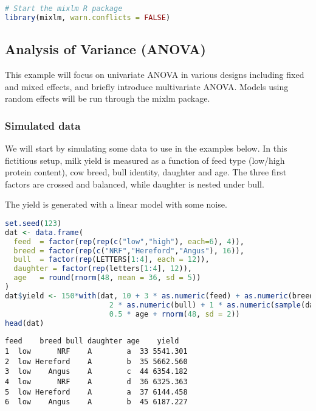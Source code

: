 \begin{lstlisting}[language=R, columns=fullflexible, basicstyle=\linespread{0.85}\small\ttfamily, stringstyle=\color{DarkGreen}, keywordstyle=\color{blue}, commentstyle=\color{DarkGreen},]
# Start the mixlm R package
library(mixlm, warn.conflicts = FALSE)
\end{lstlisting}

\subsection{Analysis of Variance
(ANOVA)}\label{analysis-of-variance-anova}

This example will focus on univariate ANOVA in various designs
including fixed and mixed effects, and briefly introduce multivariate
ANOVA. Models using random effects will be run through the mixlm
package.

\subsubsection{Simulated data}\label{simulated-data}

We will start by simulating some data to use in the examples below. In
this fictitious setup, milk yield is measured as a function of feed type
(low/high protein content), cow breed, bull identity, daughter and age.
The three first factors are crossed and balanced, while daughter is
nested under bull.

The yield is generated with a linear model with some noise.

\begin{lstlisting}[language=R, columns=fullflexible, basicstyle=\linespread{0.85}\small\ttfamily, stringstyle=\color{DarkGreen}, keywordstyle=\color{blue}, commentstyle=\color{DarkGreen},]
set.seed(123)
dat <- data.frame(
  feed  = factor(rep(rep(c("low","high"), each=6), 4)),
  breed = factor(rep(c("NRF","Hereford","Angus"), 16)),
  bull  = factor(rep(LETTERS[1:4], each = 12)),
  daughter = factor(rep(letters[1:4], 12)),
  age   = round(rnorm(48, mean = 36, sd = 5))
)
dat$yield <- 150*with(dat, 10 + 3 * as.numeric(feed) + as.numeric(breed) +
                        2 * as.numeric(bull) + 1 * as.numeric(sample(dat$daughter, 48)) +
                        0.5 * age + rnorm(48, sd = 2))
head(dat)
\end{lstlisting}
\begin{Verbatim}[fontsize=\small]
  feed    breed bull daughter age    yield
1  low      NRF    A        a  33 5541.301
2  low Hereford    A        b  35 5662.560
3  low    Angus    A        c  44 6354.182
4  low      NRF    A        d  36 6325.363
5  low Hereford    A        a  37 6144.458
6  low    Angus    A        b  45 6187.227
\end{Verbatim}

